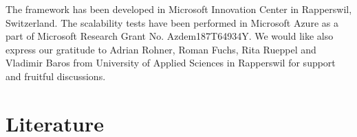 \documentclass[3p,times]{elsarticle}
\begin{document}
The framework has been developed in Microsoft Innovation Center in Rapperswil, Switzerland. The scalability tests have been performed in Microsoft Azure as a part of Microsoft Research Grant No. Azdem187T64934Y. We would like also express our gratitude to Adrian Rohner, Roman Fuchs, Rita Rueppel and Vladimir Baros from University of Applied Sciences in Rapperswil for support and fruitful discussions.

\section{Literature}
\label{sec:literature}



\end{document}
